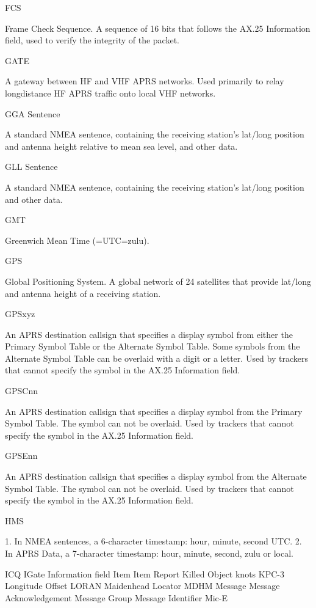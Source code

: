 {FCS

Frame Check Sequence. A sequence of 16 bits that follows the AX.25 Information
field, used to verify the integrity of the packet.

GATE

A gateway between HF and VHF APRS networks. Used primarily to relay longdistance HF APRS traffic onto local VHF networks.

GGA Sentence

A standard NMEA sentence, containing the receiving station’s lat/long position and
antenna height relative to mean sea level, and other data.

GLL Sentence

A standard NMEA sentence, containing the receiving station’s lat/long position and
other data.

GMT

Greenwich Mean Time (=UTC=zulu).

GPS

Global Positioning System. A global network of 24 satellites that provide lat/long and
antenna height of a receiving station.

GPSxyz

An APRS destination callsign that specifies a display symbol from either the Primary
Symbol Table or the Alternate Symbol Table. Some symbols from the Alternate
Symbol Table can be overlaid with a digit or a letter. Used by trackers that cannot
specify the symbol in the AX.25 Information field.

GPSCnn

An APRS destination callsign that specifies a display symbol from the Primary Symbol
Table. The symbol can not be overlaid. Used by trackers that cannot specify the
symbol in the AX.25 Information field.

GPSEnn

An APRS destination callsign that specifies a display symbol from the Alternate
Symbol Table. The symbol can not be overlaid. Used by trackers that cannot specify
the symbol in the AX.25 Information field.

HMS

1. In NMEA sentences, a 6-character timestamp: hour, minute, second UTC.
2. In APRS Data, a 7-character timestamp: hour, minute, second, zulu or local.

ICQ
IGate
Information field
Item
Item Report
Killed Object
knots
KPC-3
Longitude Offset
LORAN
Maidenhead Locator
MDHM
Message
Message Acknowledgement
Message Group
Message Identifier
Mic-E

}
